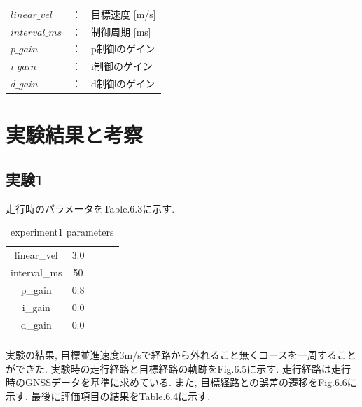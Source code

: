 \begin{table}[H]
     \centering
     \begin{tabular}{lcl}
         $linear\_vel$ & ： & 目標速度 [m/s] \\
         $interval\_ms$ & ： & 制御周期 [ms] \\
         $p\_gain$ & ： & p制御のゲイン\\
         $i\_gain$ & ： & i制御のゲイン\\
         $d\_gain$ & ： & d制御のゲイン\\
     \end{tabular}
\end{table}

\newpage

\section{実験結果と考察}

\subsection{実験1}
走行時のパラメータをTable.6.3に示す.
\begin{table}[H]
     \centering
     \caption{experiment1 parameters}
     \begin{tabular}{cclll}
     \multicolumn{1}{c|}{linear\_vel}     & 3.0  &  &  &  \\
     \multicolumn{1}{c|}{interval\_ms}    & 50   &  &  &  \\
     \multicolumn{1}{c|}{p\_gain}          & 0.8  &  &  &  \\
     \multicolumn{1}{c|}{i\_gain}          & 0.0  &  &  &  \\
     \multicolumn{1}{c|}{d\_gain}          & 0.0 &  &  &  \\
     \multicolumn{1}{l}{}                 &      &  &  &  \\
     \end{tabular}
\end{table}

実験の結果, 目標並進速度3m/sで経路から外れること無くコースを一周することができた.
実験時の走行経路と目標経路の軌跡をFig.6.5に示す.
走行経路は走行時のGNSSデータを基準に求めている.
また, 目標経路との誤差の遷移をFig.6.6に示す.
最後に評価項目の結果をTable.6.4に示す.

